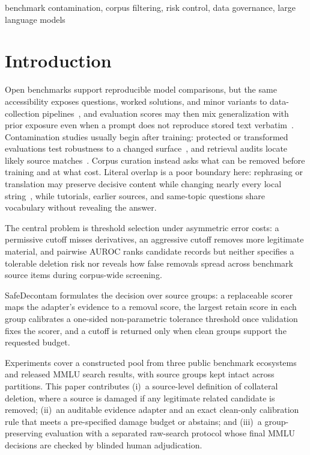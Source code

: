 \documentclass[conference]{IEEEtran}
\begin{document}
\vspace{10pt}
\begin{IEEEkeywords}
benchmark contamination, corpus filtering, risk control, data governance, large language models
\end{IEEEkeywords}

\section{Introduction}
Open benchmarks support reproducible model comparisons, but the same accessibility exposes questions, worked solutions, and minor variants to data-collection pipelines~\cite{sainz2023}, and evaluation scores may then mix generalization with prior exposure even when a prompt does not reproduce stored text verbatim~\cite{deng2024}. Contamination studies usually begin after training: protected or transformed evaluations test robustness to a changed surface~\cite{jacovi2023}, and retrieval audits locate likely source matches~\cite{li2024}. Corpus curation instead asks what can be removed before training and at what cost. Literal overlap is a poor boundary here: rephrasing or translation may preserve decisive content while changing nearly every local string~\cite{yang2023}, while tutorials, earlier sources, and same-topic questions share vocabulary without revealing the answer.

The central problem is threshold selection under asymmetric error costs: a permissive cutoff misses derivatives, an aggressive cutoff removes more legitimate material, and pairwise AUROC ranks candidate records but neither specifies a tolerable deletion risk nor reveals how false removals spread across benchmark source items during corpus-wide screening.

SafeDecontam formulates the decision over source groups: a replaceable scorer maps the adapter's evidence to a removal score, the largest retain score in each group calibrates a one-sided non-parametric tolerance threshold once validation fixes the scorer, and a cutoff is returned only when clean groups support the requested budget.

Experiments cover a constructed pool from three public benchmark ecosystems and released MMLU search results, with source groups kept intact across partitions. This paper contributes (i)~a source-level definition of collateral deletion, where a source is damaged if any legitimate related candidate is removed; (ii)~an auditable evidence adapter and an exact clean-only calibration rule that meets a pre-specified damage budget or abstains; and (iii)~a group-preserving evaluation with a separated raw-search protocol whose final MMLU decisions are checked by blinded human adjudication.
\end{document}
